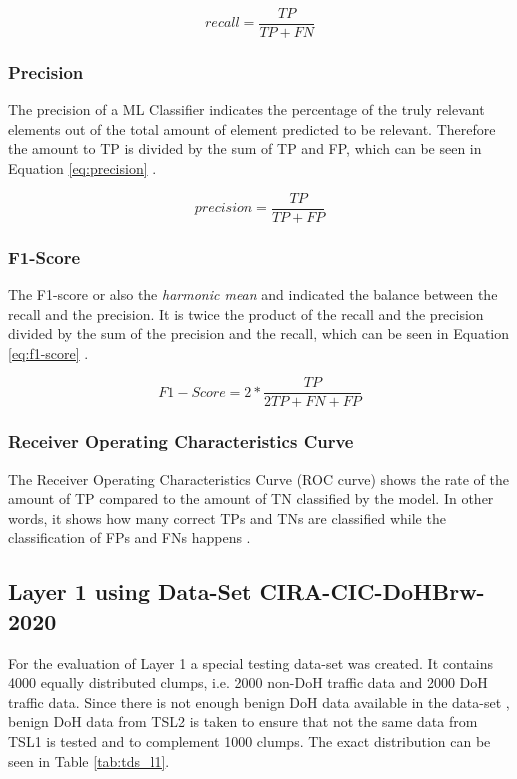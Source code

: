 \begin{equation}
    recall = \frac{TP}{TP+FN}
    \label{eq:recall}
\end{equation}

\subsubsection{Precision}
The precision of a ML Classifier indicates the percentage of the truly relevant elements out of the total amount of element predicted to be relevant. Therefore the amount to TP is divided by the sum of TP and FP, which can be seen in Equation \ref{eq:precision} \cite{Zheng2015EvaluatingML}.

\begin{equation}
    precision = \frac{TP}{TP+FP}
    \label{eq:precision}
\end{equation}

\subsubsection{F1-Score}
The F1-score or also the \textit{harmonic mean} and indicated the balance between the recall and the precision. It is  twice the product of the recall and the precision divided by the sum of the precision and the recall, which can be seen in Equation \ref{eq:f1-score} \cite{Zheng2015EvaluatingML}.

\begin{equation}
    F1-Score = 2*\frac{TP}{2TP+FN+FP}
    \label{eq:f1-score}
\end{equation}

\subsubsection{Receiver Operating Characteristics Curve}
The Receiver Operating Characteristics Curve (ROC curve) shows the rate of the amount of TP compared to the amount of TN classified by the model. In other words, it shows how many correct TPs and TNs are classified while the classification of FPs and FNs happens \cite{Zheng2015EvaluatingML}.

\subsection{Layer 1 using Data-Set CIRA-CIC-DoHBrw-2020} \label{eval_l1}
For the evaluation of Layer 1 a special testing data-set was created. It contains 4000 equally distributed clumps, i.e. 2000 non-DoH traffic data and 2000 DoH traffic data. Since there is not enough benign DoH data available in the data-set \cite{CIRA-CIC-DoHBrw-2020}, benign DoH data from TSL2 is taken to ensure that not the same data from TSL1 is tested and to complement 1000 clumps. The exact distribution can be seen in Table \ref{tab:tds_l1}. 

